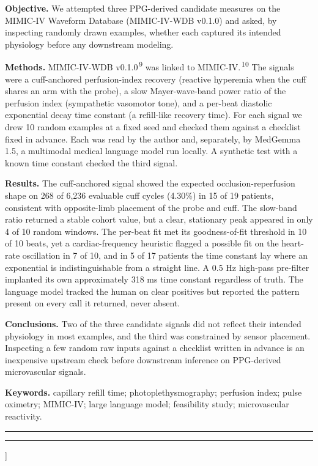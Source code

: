 \documentclass[twocolumn,letterpaper,10pt]{article}
\renewcommand{\cite}[1]{\textsuperscript{\,#1}}
\newcommand{\accenttitlerule}{%
  {\color{accent}\rule{\textwidth}{1.1pt}}\par\vspace{2pt}%
  {\color{accent}\rule{\textwidth}{0.4pt}}\par}
\begin{document}
  \textbf{Objective.} We attempted three PPG-derived candidate measures on the MIMIC-IV Waveform Database (MIMIC-IV-WDB v0.1.0) and asked, by inspecting randomly drawn examples, whether each captured its intended physiology before any downstream modeling.

  \textbf{Methods.} MIMIC-IV-WDB v0.1.0\cite{9} was linked to MIMIC-IV.\cite{10} The signals were a cuff-anchored perfusion-index recovery (reactive hyperemia when the cuff shares an arm with the probe), a slow Mayer-wave-band power ratio of the perfusion index (sympathetic vasomotor tone), and a per-beat diastolic exponential decay time constant (a refill-like recovery time). For each signal we drew 10 random examples at a fixed seed and checked them against a checklist fixed in advance. Each was read by the author and, separately, by MedGemma 1.5, a multimodal medical language model run locally. A synthetic test with a known time constant checked the third signal.

  \textbf{Results.} The cuff-anchored signal showed the expected occlusion-reperfusion shape on 268 of 6{,}236 evaluable cuff cycles (4.30\%) in 15 of 19 patients, consistent with opposite-limb placement of the probe and cuff. The slow-band ratio returned a stable cohort value, but a clear, stationary peak appeared in only 4 of 10 random windows. The per-beat fit met its goodness-of-fit threshold in 10 of 10 beats, yet a cardiac-frequency heuristic flagged a possible fit on the heart-rate oscillation in 7 of 10, and in 5 of 17 patients the time constant lay where an exponential is indistinguishable from a straight line. A 0.5 Hz high-pass pre-filter implanted its own approximately 318 ms time constant regardless of truth. The language model tracked the human on clear positives but reported the pattern present on every call it returned, never absent.

  \textbf{Conclusions.} Two of the three candidate signals did not reflect their intended physiology in most examples, and the third was constrained by sensor placement. Inspecting a few random raw inputs against a checklist written in advance is an inexpensive upstream check before downstream inference on PPG-derived microvascular signals.

  \textbf{Keywords.} capillary refill time; photoplethysmography; perfusion index; pulse oximetry; MIMIC-IV; large language model; feasibility study; microvascular reactivity.
  \par\endgroup
  \vspace{0.4em}
  \accenttitlerule
  \vspace{0.9em}
]
\end{document}

